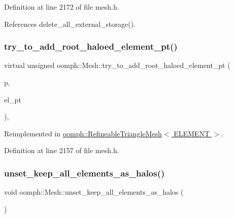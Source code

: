 Definition at line 2172 of file mesh.\+h.



References delete\+\_\+all\+\_\+external\+\_\+storage().

\mbox{\label{classoomph_1_1Mesh_aafe4f0a71859972be0c7c0957c69d5de}} 
\subsubsection{\texorpdfstring{try\+\_\+to\+\_\+add\+\_\+root\+\_\+haloed\+\_\+element\+\_\+pt()}{try\_to\_add\_root\_haloed\_element\_pt()}}
{\footnotesize\ttfamily virtual unsigned oomph\+::\+Mesh\+::try\+\_\+to\+\_\+add\+\_\+root\+\_\+haloed\+\_\+element\+\_\+pt (\begin{DoxyParamCaption}\item[{const unsigned \&}]{p,  }\item[{\hyperlink{classoomph_1_1GeneralisedElement}{Generalised\+Element} $\ast$\&}]{el\+\_\+pt }\end{DoxyParamCaption})\hspace{0.3cm}{\ttfamily [inline]}, {\ttfamily [virtual]}}



Reimplemented in \hyperlink{classoomph_1_1RefineableTriangleMesh_a40ed8992d60508600cb3f3d0b9fb2c46}{oomph\+::\+Refineable\+Triangle\+Mesh$<$ E\+L\+E\+M\+E\+N\+T $>$}.



Definition at line 2157 of file mesh.\+h.

\mbox{\label{classoomph_1_1Mesh_ac0bf3e23f2a5ee4521df5541d047728f}} 
\subsubsection{\texorpdfstring{unset\+\_\+keep\+\_\+all\+\_\+elements\+\_\+as\+\_\+halos()}{unset\_keep\_all\_elements\_as\_halos()}}
{\footnotesize\ttfamily void oomph\+::\+Mesh\+::unset\+\_\+keep\+\_\+all\+\_\+elements\+\_\+as\+\_\+halos (\begin{DoxyParamCaption}{ }\end{DoxyParamCaption})\hspace{0.3cm}{\ttfamily [inline]}}



